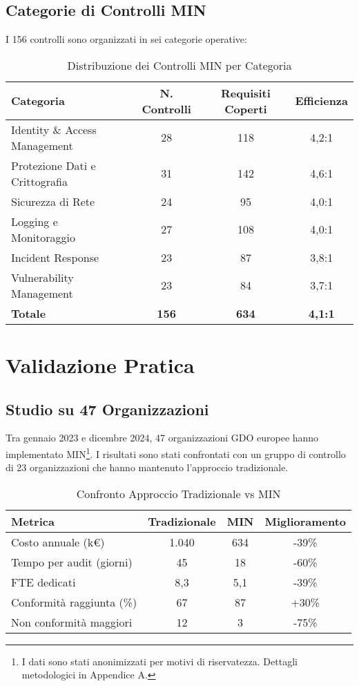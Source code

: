 \subsection{Categorie di Controlli MIN}

I 156 controlli sono organizzati in sei categorie operative:

\begin{table}[h]
\centering
\caption{Distribuzione dei Controlli MIN per Categoria}
\begin{tabular}{|l|c|c|c|}
\hline
\textbf{Categoria} & \textbf{N. Controlli} & \textbf{Requisiti Coperti} & \textbf{Efficienza} \\
\hline
Identity \& Access Management & 28 & 118 & 4,2:1 \\
Protezione Dati e Crittografia & 31 & 142 & 4,6:1 \\
Sicurezza di Rete & 24 & 95 & 4,0:1 \\
Logging e Monitoraggio & 27 & 108 & 4,0:1 \\
Incident Response & 23 & 87 & 3,8:1 \\
Vulnerability Management & 23 & 84 & 3,7:1 \\
\hline
\textbf{Totale} & \textbf{156} & \textbf{634} & \textbf{4,1:1} \\
\hline
\end{tabular}
\end{table}

\section{Validazione Pratica}

\subsection{Studio su 47 Organizzazioni}

Tra gennaio 2023 e dicembre 2024, 47 organizzazioni GDO europee hanno implementato MIN\footnote{I dati sono stati anonimizzati per motivi di riservatezza. Dettagli metodologici in Appendice A.}. I risultati sono stati confrontati con un gruppo di controllo di 23 organizzazioni che hanno mantenuto l'approccio tradizionale.

\begin{table}[h]
\centering
\caption{Confronto Approccio Tradizionale vs MIN}
\begin{tabular}{|l|c|c|c|}
\hline
\textbf{Metrica} & \textbf{Tradizionale} & \textbf{MIN} & \textbf{Miglioramento} \\
\hline
Costo annuale (k€) & 1.040 & 634 & -39\% \\
Tempo per audit (giorni) & 45 & 18 & -60\% \\
FTE dedicati & 8,3 & 5,1 & -39\% \\
Conformità raggiunta (\%) & 67 & 87 & +30\% \\
Non conformità maggiori & 12 & 3 & -75\% \\
\hline
\end{tabular}
\end{table}

